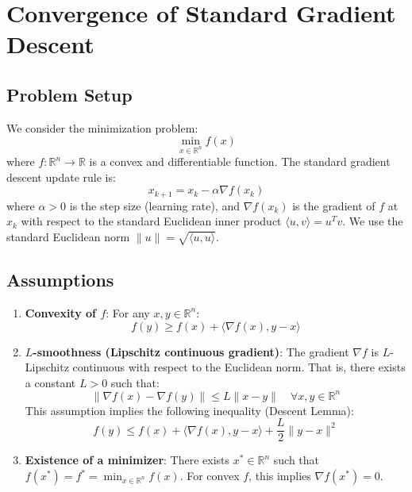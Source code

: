 \documentclass{article}
\newcommand{\R}{\mathbb{R}}
\newcommand{\norm}[1]{\|#1\|}          %
\newcommand{\ip}[2]{\langle #1, #2 \rangle} %
\newcommand{\grad}{\nabla}             %
\begin{document}
\section*{Convergence of Standard Gradient Descent}

\subsection*{Problem Setup}
We consider the minimization problem:
\begin{equation*}
    \min_{x \in \R^n} f(x)
\end{equation*}
where $f: \R^n \to \R$ is a convex and differentiable function.
The standard gradient descent update rule is:
\begin{equation} \label{eq:gd_update}
    x_{k+1} = x_k - \alpha \grad f(x_k)
\end{equation}
where $\alpha > 0$ is the step size (learning rate), and $\grad f(x_k)$ is the gradient of $f$ at $x_k$ with respect to the standard Euclidean inner product $\ip{u}{v} = u^T v$. We use the standard Euclidean norm $\norm{u} = \sqrt{\ip{u}{u}}$.

\subsection*{Assumptions}
\begin{enumerate}
    \item \textbf{Convexity of $f$}: For any $x, y \in \R^n$:
          \begin{equation} \label{eq:convexity}
              f(y) \ge f(x) + \ip{\grad f(x)}{y-x}
          \end{equation}
    \item \textbf{$L$-smoothness (Lipschitz continuous gradient)}: The gradient $\grad f$ is $L$-Lipschitz continuous with respect to the Euclidean norm. That is, there exists a constant $L > 0$ such that:
          \begin{equation} \label{eq:l_smoothness}
              \norm{\grad f(x) - \grad f(y)} \le L \norm{x - y} \quad \forall x, y \in \R^n
          \end{equation}
          This assumption implies the following inequality (Descent Lemma):
          \begin{equation} \label{eq:descent_lemma}
              f(y) \le f(x) + \ip{\grad f(x)}{y-x} + \frac{L}{2} \norm{y-x}^2
          \end{equation}
    \item \textbf{Existence of a minimizer}: There exists $x^* \in \R^n$ such that $f(x^*) = f^* = \min_{x \in \R^n} f(x)$. For convex $f$, this implies $\grad f(x^*) = 0$.
\end{enumerate}
\end{document}
